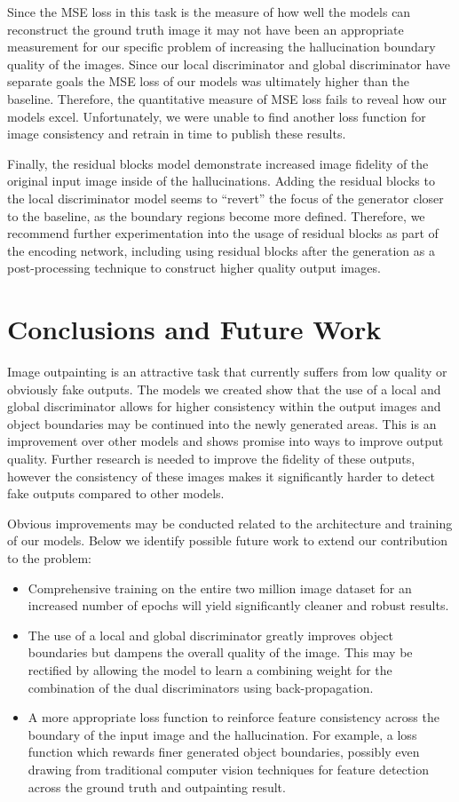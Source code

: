 \documentclass{article}
\begin{document}
Since the MSE loss in this task is the measure of how well the models can reconstruct the ground truth image it may not have been an appropriate measurement for our specific problem of increasing the hallucination boundary quality of the images. Since our local discriminator and global discriminator have separate goals the MSE loss of our models was ultimately higher than the baseline. Therefore, the quantitative measure of MSE loss fails to reveal how our models excel. Unfortunately, we were unable to find another loss function for image consistency and retrain in time to publish these results.


Finally, the residual blocks model demonstrate increased image fidelity of the original input image inside of the hallucinations. Adding the residual blocks to the local discriminator model seems to ``revert'' the focus of the generator closer to the baseline, as the boundary regions become more defined. Therefore, we recommend further experimentation into the usage of residual blocks as part of the encoding network, including using residual blocks after the generation as a post-processing technique to construct higher quality output images.

\section{Conclusions and Future Work}
Image outpainting is an attractive task that currently suffers from low quality or obviously fake outputs. The models we created show that the use of a local and global discriminator allows for higher consistency within the output images and object boundaries may be continued into the newly generated areas. This is an improvement over other models and shows promise into ways to improve output quality. Further research is needed to improve the fidelity of these outputs, however the consistency of these images makes it significantly harder to detect fake outputs compared to other models.

Obvious improvements may be conducted related to the architecture and training of our models. Below we identify possible future work to extend our contribution to the problem:
\begin{itemize}
\setlength{\partopsep}{0pt}
\setlength{\topsep}{0pt}
\setlength{\itemsep}{1pt}
	\item{Comprehensive training on the entire two million image dataset for an increased number of epochs will yield significantly cleaner and robust results.}
	\item{The use of a local and global discriminator greatly improves object boundaries but dampens the overall quality of the image. This may be rectified by allowing the model to learn a combining weight for the combination of the dual discriminators using back-propagation.}
	\item{A more appropriate loss function to reinforce feature consistency across the boundary of the input image and the hallucination. For example, a loss function which rewards finer generated object boundaries, possibly even drawing from traditional computer vision techniques for feature detection across the ground truth and outpainting result.}
\end{itemize}



\end{document}
